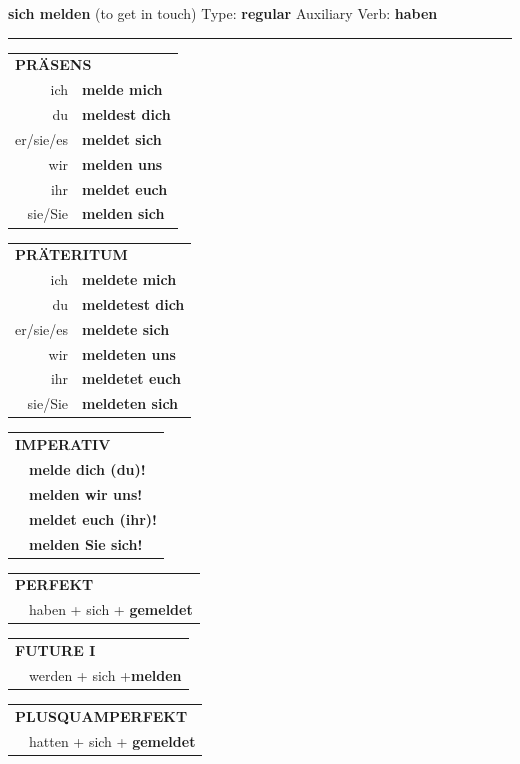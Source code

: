 \documentclass[10pt,a4paper]{revtex4-2}
\begin{document}
\begin{verbbox}
{\Large \bf sich melden} (to get in touch) \hfill Type: \textbf{regular} \hfill Auxiliary Verb: \textbf{haben}

\vspace{5pt}
\hrule
\vspace{5pt}

\begin{tabular}{rl}
\multicolumn{2}{l}{\textbf{PRÄSENS}}\\
ich & \textbf{melde mich}\\
du & \textbf{meldest dich}\\
er/sie/es & \textbf{meldet sich}\\
wir & \textbf{melden uns}\\
ihr & \textbf{meldet euch}\\
sie/Sie & \textbf{melden sich}\\
\end{tabular}
\hfill
\begin{tabular}{rl}
\multicolumn{2}{l}{\textbf{PRÄTERITUM}}\\
ich & \textbf{meldete mich}\\
du & \textbf{meldetest dich}\\
er/sie/es & \textbf{meldete sich}\\
wir & \textbf{meldeten uns}\\
ihr & \textbf{meldetet euch}\\
sie/Sie & \textbf{meldeten sich}\\
\end{tabular}
\hfill
\begin{tabular}{rl}
\multicolumn{2}{l}{\textbf{IMPERATIV}}\\
& \textbf{melde dich (du)!}\\
& \textbf{melden wir uns!}\\
& \textbf{meldet euch (ihr)!}\\
& \textbf{melden Sie sich!}\\
\end{tabular}

\vspace{10pt}

\begin{tabular}{rl}
\multicolumn{2}{l}{\textbf{PERFEKT}}\\
& haben + sich + \textbf{gemeldet}\\
\end{tabular}
\hfill
\begin{tabular}{rl}
\multicolumn{2}{l}{\textbf{FUTURE I}}\\
& werden + sich +\textbf{melden}\\
\end{tabular}
\hfill
\begin{tabular}{rl}
\multicolumn{2}{l}{\textbf{PLUSQUAMPERFEKT}}\\
& hatten + sich + \textbf{gemeldet}\\
\end{tabular}


\end{verbbox}
\end{document}
